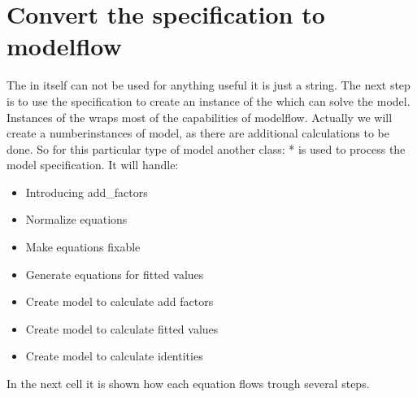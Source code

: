 \documentclass[letterpaper,10pt,english]{jupyterBook}
\begin{document}
\section{Convert the specification to modelflow}
\label{\detokenize{content/howto/smallmodel/modelstart:convert-the-specification-to-modelflow}}
\sphinxAtStartPar
The  in itself can not be used for anything useful \sphinxhyphen{} it is just a string. The next step is to use the
specification to create an instance of the   which can solve the model. Instances of the  wraps most of the capabilities of modelflow. Actually we will create a numberinstances of model, as there are additional calculations to be done. So for this particular type of model another class: * is used to process the model specification. It will handle:
\begin{itemize}
\item {} 
\sphinxAtStartPar
Introducing add\_factors

\item {} 
\sphinxAtStartPar
Normalize equations

\item {} 
\sphinxAtStartPar
Make equations fixable

\item {} 
\sphinxAtStartPar
Generate equations for fitted values

\item {} 
\sphinxAtStartPar
Create model to calculate add factors

\item {} 
\sphinxAtStartPar
Create model to calculate fitted values

\item {} 
\sphinxAtStartPar
Create model to calculate identities

\end{itemize}

\sphinxAtStartPar
In the next cell it is shown how each equation flows trough several steps.
\end{document}
